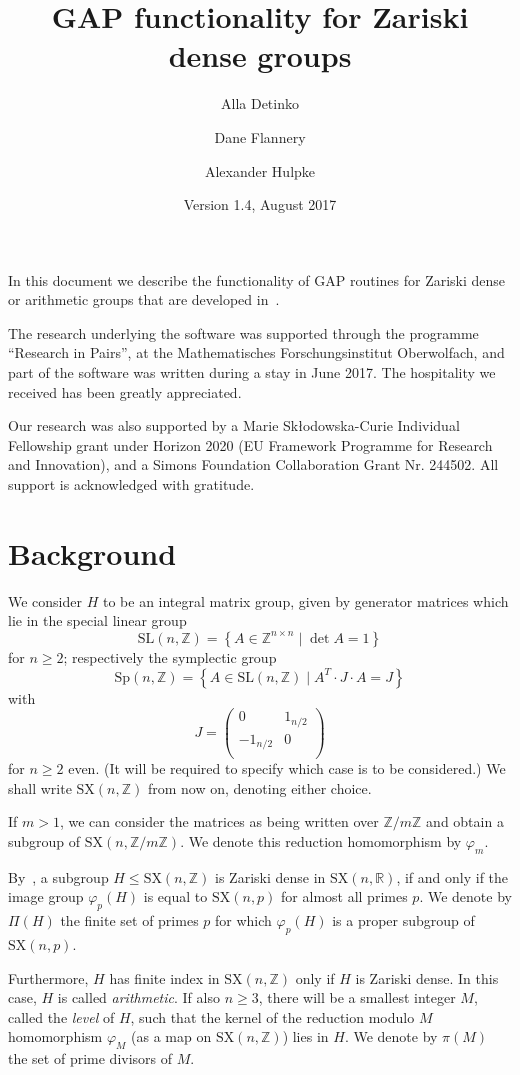 \documentclass[a4paper,12pt]{amsart}
\title{{\sf GAP} functionality for Zariski dense groups}
\author{Alla Detinko}
\author{Dane Flannery}
\author{Alexander Hulpke}
\date{Version 1.4, August 2017}
\newcommand{\Z}{\mathbb{Z}}
\newcommand{\SL}{\mathrm{SL}}
\newcommand{\Sp}{\mathrm{Sp}}
\newcommand{\SX}{\mathrm{SX}}
\begin{document}
\maketitle

In this document we describe the functionality of {\sf GAP} \cite{Gap} 
routines for Zariski dense or arithmetic groups that are developed
in~\cite{Arithm,Density, MFO}.

The research underlying the software was supported through the programme
``Research in Pairs'', at the Mathematisches Forschungsinstitut Oberwolfach,
and part of the software was written during a stay in June 2017.
The hospitality we received has been greatly appreciated. 

Our research was also supported by a Marie Sk\l odowska-Curie Individual
Fellowship grant under Horizon 2020 (EU Framework Programme for
Research and Innovation),
and a Simons Foundation Collaboration Grant Nr. 244502. All support
is acknowledged with gratitude.

\section{Background}

We consider $H$ to be an integral matrix group, given by generator matrices
which lie in the special linear group
\[
\SL(n,\Z)=\left\{A\in\Z^{n\times n}\mid \det A=1\right\}
\]
for $n\ge 2$; respectively the symplectic group
\[
\Sp(n,\Z)=\left\{A\in \SL(n,\Z)\mid A^T\cdot J\cdot A=J\right\}
\]
with 
\[
J=\left(\begin{array}{cc}0&1_{n/2}\\
-1_{n/2}&0\\
\end{array}\right) 
\]
for $n\ge 2$ even.
(It will be required to specify which case is to be considered.)  We shall write $\SX(n,\Z)$ from now on,
denoting either choice.

If $m>1$, we can consider the matrices
as being written over $\Z/m\Z$ and obtain a subgroup of $\SX(n,\Z/m\Z)$.
We denote this reduction homomorphism by
$\varphi_m$.

By~\cite{Matthews},
a subgroup $H \leq \SX(n,\Z)$ is Zariski dense in $\SX(n,{\mathbb R})$, if
and only if the
image group $\varphi_p(H)$ is equal to $\SX(n,p)$ for almost all primes
$p$. We denote by $\Pi(H)$ the finite set of primes $p$ for which
$\varphi_p(H)$ is a proper subgroup of $\SX(n,p)$.

Furthermore, $H$ has finite index in $\SX(n,\Z)$ only if $H$ is Zariski
dense. In this case, $H$ is called {\em arithmetic}.
If also $n\ge 3$, there will be a smallest integer $M$, called the 
{\em level} of $H$, such that the kernel of the reduction modulo $M$ homomorphism $\varphi_M$ (as a map on $\SX(n,\Z)$)
lies in $H$.
We denote by $\pi(M)$ the set of prime divisors of $M$.
\medskip
\end{document}
